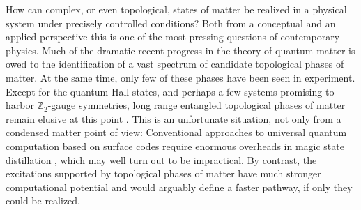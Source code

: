 \documentclass[twocolumn,floats,prx,showpacs]{revtex4-1}
\begin{document}
How can complex, or even topological, states of matter be realized in a physical system under precisely controlled conditions? Both from a conceptual and an applied perspective this is one of the most pressing questions of contemporary physics. Much of the dramatic recent progress in the  theory of quantum matter is owed to the identification of a vast spectrum of candidate topological phases of matter. At the same time, only few of these phases have been seen in experiment. Except for the quantum Hall states, and perhaps a few systems promising to harbor $\mathbb{Z}_2$-gauge symmetries, long range entangled topological phases of matter remain elusive at this point \cite{qc3,Wen2017}. This is an unfortunate situation, not only from a condensed matter point of view: Conventional approaches to universal quantum computation based on surface codes \cite{TopologicalQuantumMemory} require  enormous overheads in magic state distillation \cite{PhysRevA.71.022316}, which may well turn out to be impractical. By contrast, the excitations supported by topological phases of matter have much stronger computational potential \cite{Kitaev-AnnPhys-2003,qc3,RevModPhys.87.307} and would arguably define a faster pathway, if only they could be realized.   
\end{document}
